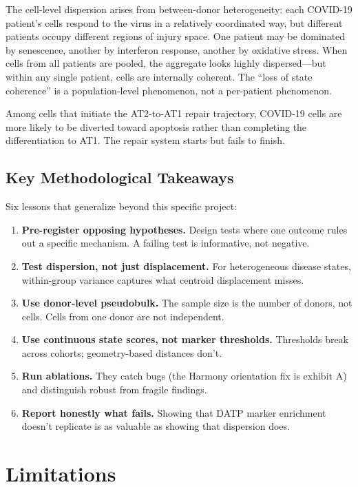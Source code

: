 \documentclass[11pt]{article}
\begin{document}
The cell-level dispersion arises from between-donor heterogeneity: each COVID-19 patient's cells respond to the virus in a relatively coordinated way, but different patients occupy different regions of injury space. One patient may be dominated by senescence, another by interferon response, another by oxidative stress. When cells from all patients are pooled, the aggregate looks highly dispersed---but within any single patient, cells are internally coherent. The ``loss of state coherence'' is a population-level phenomenon, not a per-patient phenomenon.

Among cells that initiate the AT2-to-AT1 repair trajectory, COVID-19 cells are more likely to be diverted toward apoptosis rather than completing the differentiation to AT1. The repair system starts but fails to finish.

\subsection{Key Methodological Takeaways}

Six lessons that generalize beyond this specific project:

\begin{enumerate}
\item \textbf{Pre-register opposing hypotheses.} Design tests where one outcome rules out a specific mechanism. A failing test is informative, not negative.
\item \textbf{Test dispersion, not just displacement.} For heterogeneous disease states, within-group variance captures what centroid displacement misses.
\item \textbf{Use donor-level pseudobulk.} The sample size is the number of donors, not cells. Cells from one donor are not independent.
\item \textbf{Use continuous state scores, not marker thresholds.} Thresholds break across cohorts; geometry-based distances don't.
\item \textbf{Run ablations.} They catch bugs (the Harmony orientation fix is exhibit A) and distinguish robust from fragile findings.
\item \textbf{Report honestly what fails.} Showing that DATP marker enrichment doesn't replicate is as valuable as showing that dispersion does.
\end{enumerate}


\section{Limitations}
\end{document}
